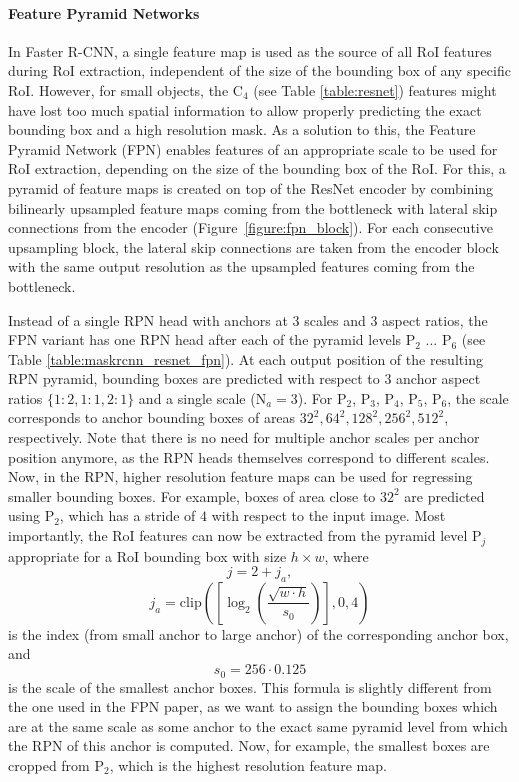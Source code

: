 \paragraph{Feature Pyramid Networks}
In Faster R-CNN, a single feature map is used as the source of all RoI features during RoI extraction, independent
of the size of the bounding box of any specific RoI.
However, for small objects, the C$_4$ (see Table \ref{table:resnet}) features
might have lost too much spatial information to allow properly predicting the exact bounding
box and a high resolution mask.
As a solution to this, the Feature Pyramid Network (FPN) \cite{FPN} enables features
of an appropriate scale to be used for RoI extraction, depending on the size of the bounding box of the RoI.
For this, a pyramid of feature maps is created on top of the ResNet \cite{ResNet}
encoder by combining bilinearly upsampled feature maps coming from the bottleneck
with lateral skip connections from the encoder (Figure~\ref{figure:fpn_block}).
For each consecutive upsampling block, the lateral skip connections are taken from
the encoder block with the same output resolution as the upsampled features coming
from the bottleneck.

Instead of a single RPN head with anchors at 3 scales and 3 aspect ratios,
the FPN variant has one RPN head after each of the pyramid levels P$_2$ ... P$_6$ (see Table \ref{table:maskrcnn_resnet_fpn}).
At each output position of the resulting RPN pyramid, bounding boxes are predicted
with respect to 3 anchor aspect ratios $\{1:2, 1:1, 2:1\}$ and a single scale ($\text{N}_a = 3$).
For P$_2$, P$_3$, P$_4$, P$_5$, P$_6$,
the scale corresponds to anchor bounding boxes of areas $32^2, 64^2, 128^2, 256^2, 512^2$,
respectively.
Note that there is no need for multiple anchor scales per anchor position anymore,
as the RPN heads themselves correspond to different scales.
Now, in the RPN, higher resolution feature maps can be used for regressing smaller
bounding boxes. For example, boxes of area close to $32^2$ are predicted using P$_2$,
which has a stride of $4$ with respect to the input image.
Most importantly, the RoI features can now be extracted from the pyramid level P$_j$ appropriate for a
RoI bounding box with size $h \times w$, where
\begin{equation}
j = 2 + j_a,
\end{equation}
\begin{equation}
j_a = \mathrm{clip}\left(\left[\log_2\left(\frac{\sqrt{w \cdot h}}{s_0}\right)\right], 0, 4\right)
\label{eq:level_assignment}
\end{equation}
is the index (from small anchor to large anchor) of the corresponding anchor box, and
\begin{equation}
s_0 = 256 \cdot 0.125
\label{eq:level_assignment}
\end{equation}
is the scale of the smallest anchor boxes.
This formula is slightly different from the one used in the FPN paper,
as we want to assign the bounding boxes which are at the same scale
as some anchor to the exact same pyramid level from which the RPN of this
anchor is computed. Now, for example, the smallest boxes are cropped from P$_2$,
which is the highest resolution feature map.

